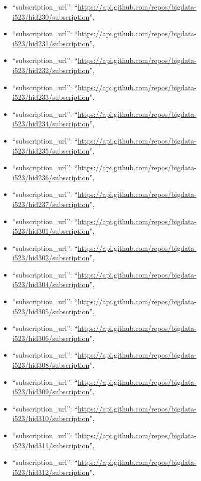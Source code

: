 \begin{itemize}
\item
  ``subscription\_url'':
  ``\url{https://api.github.com/repos/bigdata-i523/hid230/subscription}'',
\item
  ``subscription\_url'':
  ``\url{https://api.github.com/repos/bigdata-i523/hid231/subscription}'',
\item
  ``subscription\_url'':
  ``\url{https://api.github.com/repos/bigdata-i523/hid232/subscription}'',
\item
  ``subscription\_url'':
  ``\url{https://api.github.com/repos/bigdata-i523/hid233/subscription}'',
\item
  ``subscription\_url'':
  ``\url{https://api.github.com/repos/bigdata-i523/hid234/subscription}'',
\item
  ``subscription\_url'':
  ``\url{https://api.github.com/repos/bigdata-i523/hid235/subscription}'',
\item
  ``subscription\_url'':
  ``\url{https://api.github.com/repos/bigdata-i523/hid236/subscription}'',
\item
  ``subscription\_url'':
  ``\url{https://api.github.com/repos/bigdata-i523/hid237/subscription}'',
\item
  ``subscription\_url'':
  ``\url{https://api.github.com/repos/bigdata-i523/hid301/subscription}'',
\item
  ``subscription\_url'':
  ``\url{https://api.github.com/repos/bigdata-i523/hid302/subscription}'',
\item
  ``subscription\_url'':
  ``\url{https://api.github.com/repos/bigdata-i523/hid304/subscription}'',
\item
  ``subscription\_url'':
  ``\url{https://api.github.com/repos/bigdata-i523/hid305/subscription}'',
\item
  ``subscription\_url'':
  ``\url{https://api.github.com/repos/bigdata-i523/hid306/subscription}'',
\item
  ``subscription\_url'':
  ``\url{https://api.github.com/repos/bigdata-i523/hid308/subscription}'',
\item
  ``subscription\_url'':
  ``\url{https://api.github.com/repos/bigdata-i523/hid309/subscription}'',
\item
  ``subscription\_url'':
  ``\url{https://api.github.com/repos/bigdata-i523/hid310/subscription}'',
\item
  ``subscription\_url'':
  ``\url{https://api.github.com/repos/bigdata-i523/hid311/subscription}'',
\item
  ``subscription\_url'':
  ``\url{https://api.github.com/repos/bigdata-i523/hid312/subscription}'',

\end{itemize}
